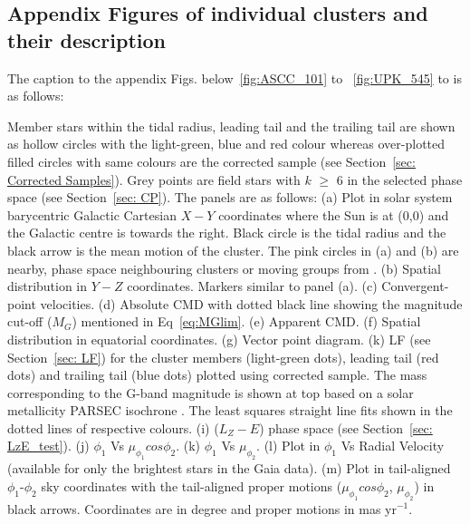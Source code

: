 \documentclass{aa}
\begin{document}
\begin{appendix}

\subsection{Appendix Figures of individual clusters and their description}\label{sec:Fig_Desc}

The caption to the appendix Figs. below~\ref{fig:ASCC_101} to ~\ref{fig:UPK_545} to is as follows:

Member stars within the tidal radius, leading tail and the trailing tail are shown as hollow circles with the light-green, blue and red colour whereas over-plotted filled circles with same colours are the corrected sample (see Section~\ref{sec: Corrected Samples}). Grey points are field stars with $k$ $\geq$ 6 in the selected phase space (see Section~\ref{sec: CP}). The panels are as follows: (a) Plot in solar system barycentric Galactic Cartesian $X-Y$ coordinates where the Sun is at (0,0) and the Galactic centre is towards the right. Black circle is the tidal radius and the black arrow is the mean motion of the cluster. The pink circles in (a) and (b) are nearby, phase space neighbouring clusters or moving groups from . (b) Spatial distribution in $Y-Z$ coordinates. Markers similar to panel (a). (c) Convergent-point velocities. (d) Absolute CMD with dotted black line showing the magnitude cut-off ($M_G$) mentioned in Eq~\ref{eq:MGlim}. (e) Apparent CMD. (f) Spatial distribution in equatorial coordinates. (g) Vector point diagram. (k) LF (see Section~\ref{sec: LF}) for the cluster members (light-green dots), leading tail (red dots) and trailing tail (blue dots) plotted using corrected sample. The mass corresponding to the G-band magnitude is shown at top based on a solar metallicity PARSEC isochrone \citep{2012MNRAS.427..127Bressan_Parsec_iso}. The least squares straight line fits shown in the dotted lines of respective colours. (i) ($L_Z - E$) phase space (see Section~\ref{sec: LzE_test}). (j) $\phi_1$ Vs $\mu_{\phi_{1}} cos \phi_2 $. (k) $\phi_1$ Vs $\mu_{\phi_{2}} $. (l) Plot in $\phi_1$ Vs Radial Velocity (available for only the brightest stars in the Gaia data). (m) Plot in tail-aligned $\phi_1$-$\phi_2$ sky coordinates with the tail-aligned proper motions ($\mu_{\phi_{1}} cos \phi_2 $, $\mu_{\phi_{2}} $) in black arrows. Coordinates are in degree and proper motions in mas yr$^{-1}$.


\end{appendix}
\end{document}
